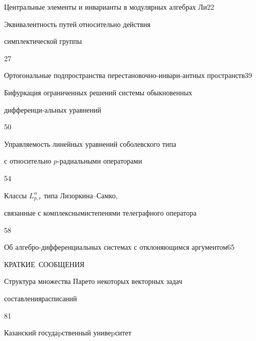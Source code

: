 

{Центральные элементы и инварианты в модулярных алгебрах Ли}{22}




{Эквивалентность путей относительно действия


симплектической группы}{27}




{Ортогональные подпространства перестановочно-инвари-\newline антных пространств}{39}




{Бифуркация ограниченных решений системы обыкновенных 


дифференци-\newline альных уравнений}{50}




{Управляемость линейных уравнений соболевского типа\newline


с относительно $p$-радиальными операторами}{54}




{Классы $L_{p,r}^\alpha$ типа Лизоркина--Самко, 


связанные с комплексными\newline степенями телеграфного оператора}{58}




{Об алгебро-дифференциальных системах с отклоняющимся аргументом}{65}





\bigskip


\bigskip





\centerline{КРАТКИЕ~СООБЩЕНИЯ}


\bigskip







{Структура множества Парето некоторых векторных задач  


составления\newline расписаний}{81}








\vfill


\noindent\raisebox{2pt}{\copyright} Казанский госудаpственный унивеpситет





